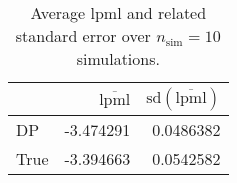 \begin{table}[H]

\caption{Average lpml and related standard error over $n_{\text{sim}} = 10$ simulations.}
\centering
\begin{tabular}[t]{lrr}
\toprule
  & $\overbar{\text{lpml}}$ & $\text{sd}(\overbar{\text{lpml}})$\\
\midrule
DP & -3.474291 & 0.0486382\\
True & -3.394663 & 0.0542582\\
\bottomrule
\end{tabular}
\end{table}